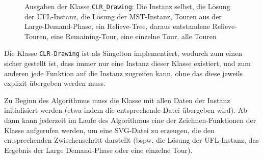 \documentclass[a4paper,ngerman,11pt,bibtotoc]{scrartcl}
\theoremstyle{definition}
\theoremstyle{plain}
\theoremstyle{remark}
\newcommand{\UFL}{UFL}
\begin{document}
\begin{figure}[H]
	
	\caption{Ausgaben der Klasse \lstinline|CLR_Drawing|: Die Instanz selbst, die Lösung der UFL-Instanz, die Lösung der MST-Instanz, Touren aus der Large-Demand-Phase, ein Relieve-Tree, daraus entstandene Relieve-Touren, eine Remaining-Tour, eine einzelne Tour, alle Touren}
\end{figure}

Die Klasse \lstinline|CLR-Drawing| ist als Singelton implementiert, wodurch zum einen sicher gestellt ist, dass immer nur eine Instanz dieser Klasse existiert, und zum anderen jede Funktion auf die Instanz zugreifen kann, ohne das diese jeweils explizit übergeben werden muss. 

Zu Beginn des Algorithmus muss die Klasse mit allen Daten der Instanz initialisiert werden (etwa indem die entsprechende Datei übergeben wird). Ab dann kann jederzeit im Laufe des Algorithmus eine der Zeichnen-Funktionen der Klasse aufgerufen werden, um eine SVG-Datei zu erzeugen, die den entsprechenden Zwischenschritt darstellt (bspw. die Lösung der \UFL-Instanz, das Ergebnis der Large Demand-Phase oder eine einzelne Tour).
\end{document}
